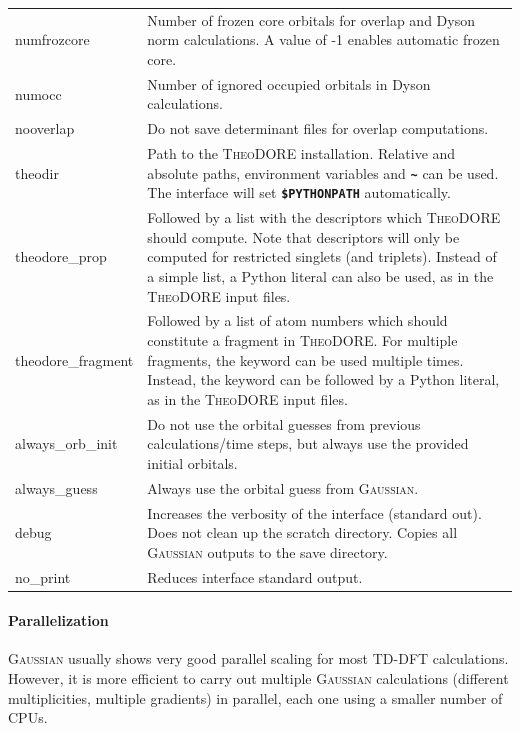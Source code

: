\documentclass[a4paper,10pt,DIV=15,openany,twoside=false]{scrbook}
\newcommand{\ttt}[1]{\textbf{\texttt{#1}}}
\begin{document}
\begin{table}
\begin{tabular}{>{\ttfamily}lp{12cm}}
\\
numfrozcore             &Number of frozen core orbitals for overlap and Dyson norm calculations. A value of -1 enables automatic frozen core.
\\
numocc                  &Number of ignored occupied orbitals in Dyson calculations.
\\
nooverlap               &Do not save determinant files for overlap computations.
\\
theodir                 &Path to the \textsc{TheoDORE} installation. Relative and absolute paths, environment variables and \ttt{\textasciitilde} can be used. The interface will set \ttt{\$PYTHONPATH} automatically.
\\
theodore\_prop          &Followed by a list with the descriptors which \textsc{TheoDORE} should compute. Note that descriptors will only be computed for restricted singlets (and triplets). Instead of a simple list, a Python literal can also be used, as in the \textsc{TheoDORE} input files.
\\
theodore\_fragment      &Followed by a list of atom numbers which should constitute a fragment in \textsc{TheoDORE}. For multiple fragments, the keyword can be used multiple times. Instead, the keyword can be followed by a Python literal, as in the \textsc{TheoDORE} input files.
\\
always\_orb\_init       &Do not use the orbital guesses from previous calculations/time steps, but always use the provided initial orbitals.
\\
always\_guess           &Always use the orbital guess from \textsc{Gaussian}.
\\
  debug                 &Increases the verbosity of the interface (standard out). Does not clean up the scratch directory. Copies all \textsc{Gaussian} outputs to the save directory.
\\
  no\_print             &Reduces interface standard output.
\\
  \bottomrule
  \end{tabular}
\end{table}

\paragraph{Parallelization}

\textsc{Gaussian} usually shows very good parallel scaling for most TD-DFT calculations.
However, it is more efficient to carry out multiple \textsc{Gaussian} calculations (different multiplicities, multiple gradients) in parallel, each one using a smaller number of CPUs.
\end{document}
